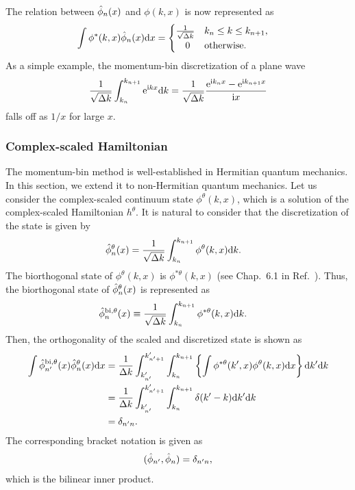 The relation between $\Hat{\phi}_n(x)$ and $\phi(k,x)$ is now represented as
\begin{align}
    \int \phi^*(k,x) \Hat{\phi}_n(x) \mathrm{d} x &= 
    \begin{cases}
        \frac{1}{\sqrt{\Delta k}} & k_n \le k \le k_{n+1} ,\\
        \ \ \ 0 & \text{otherwise} .
    \end{cases}
\end{align}
As a simple example, the momentum-bin discretization of a plane wave
\begin{align}
    \frac{1}{\sqrt{\Delta k}} \int_{k_n}^{k_{n+1}} \mathrm{e}^{\mathrm{i} kx} \mathrm{d} k = \frac{1}{\sqrt{\Delta k}} \frac{\mathrm{e}^{\mathrm{i} k_{n}x}-\mathrm{e}^{\mathrm{i} k_{n+1}x}}{\mathrm{i} x}
\end{align}
falls off as $1/x$ for large $x$.
\subsubsection{Complex-scaled Hamiltonian}
The momentum-bin method is well-established in Hermitian quantum mechanics. In this section, we extend it to non-Hermitian quantum mechanics. Let us consider the complex-scaled continuum state $\phi^{\theta}(k,x)$, which is a solution of the complex-scaled Hamiltonian $h^{\theta}$.
It is natural to consider that the discretization of the state is given by
\begin{align}
    \Hat{\phi}_n^{\theta} (x) &= \frac{1}{\sqrt{\Delta k}} \int_{k_n}^{k_{n+1}} \phi^{\theta}(k,x) \mathrm{d} k .
\end{align}
The biorthogonal state of $\phi^{\theta}(k,x)$ is $\phi^{*\theta}(k,x)$ (see Chap.\ 6.1 in Ref.~\cite{Moiseyev2011NHQM}). Thus, the biorthogonal state of $\Hat{\phi}_n^{\theta} (x)$ is represented as
\begin{align}
    \Hat{\phi}_n^{\mathrm{bi,\theta}} (x) &\equiv \frac{1}{\sqrt{\Delta k}} \int_{k_n}^{k_{n+1}} \phi^{*\theta}(k,x) \mathrm{d} k .
\end{align}
Then, the orthogonality of the scaled and discretized state is shown as
\begin{align}
    \int \Hat{\phi}_{n'}^{\mathrm{bi,\theta}} (x) \Hat{\phi}_n^{\theta} (x) \mathrm{d} x &= \frac{1}{\Delta k} \int_{k'_{n'}}^{k'_{n'+1}} \int_{k_n}^{k_{n+1}} \left\{ \int \phi^{*\theta}(k',x) \phi^{\theta}(k,x) \mathrm{d} x \right\} \mathrm{d} k'\mathrm{d} k
    \notag\\
    &=\frac{1}{\Delta k} \int_{k'_{n'}}^{k'_{n'+1}} \int_{k_n}^{k_{n+1}} \delta(k'-k) \mathrm{d} k'\mathrm{d} k
    \notag\\
    &=\delta_{n'n}.
\end{align}
The corresponding bracket notation is given as
\begin{equation}
    (\Hat\phi_{n'},\Hat\phi_n)=\delta_{n'n}, 
\end{equation}
which is the bilinear inner product.

